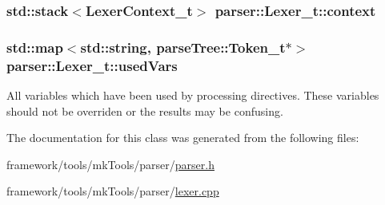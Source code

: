\subsubsection[{\texorpdfstring{context}{context}}]{\setlength{\rightskip}{0pt plus 5cm}std\+::stack$<${\bf Lexer\+Context\+\_\+t}$>$ parser\+::\+Lexer\+\_\+t\+::context\hspace{0.3cm}{\ttfamily [private]}}\hypertarget{classparser_1_1_lexer__t_afae84cc96dffa6d100481e254e92fdfb}{}\label{classparser_1_1_lexer__t_afae84cc96dffa6d100481e254e92fdfb}
\subsubsection[{\texorpdfstring{used\+Vars}{usedVars}}]{\setlength{\rightskip}{0pt plus 5cm}std\+::map$<$std\+::string, {\bf parse\+Tree\+::\+Token\+\_\+t}$\ast$$>$ parser\+::\+Lexer\+\_\+t\+::used\+Vars\hspace{0.3cm}{\ttfamily [private]}}\hypertarget{classparser_1_1_lexer__t_a1bc0d9834fc7e2824dc22957ab9c3ad6}{}\label{classparser_1_1_lexer__t_a1bc0d9834fc7e2824dc22957ab9c3ad6}
All variables which have been used by processing directives. These variables should not be overriden or the results may be confusing. 

The documentation for this class was generated from the following files\+:\begin{DoxyCompactItemize}
\item 
framework/tools/mk\+Tools/parser/\hyperlink{parser_8h}{parser.\+h}\item 
framework/tools/mk\+Tools/parser/\hyperlink{lexer_8cpp}{lexer.\+cpp}\end{DoxyCompactItemize}
